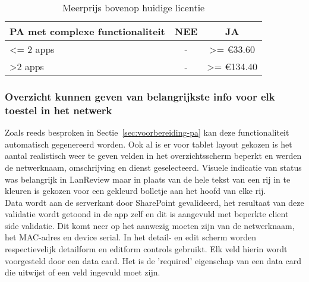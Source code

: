 \begin{table}[h!]
    \begin{tabular}{|l|c|c|}
        \hline
        \textbf{PA met complexe functionaliteit} & \textbf{NEE} & \textbf{JA}             \\ \hline
        \textless{}= 2 apps                      & -            & \textgreater{}= \euro 33.60  \\ \hline
        \textgreater 2 apps                      & -            & \textgreater{}= \euro 134.40 \\ \hline
    \end{tabular}
    \caption{Meerprijs bovenop huidige licentie}
\end{table}

\subsubsection{Overzicht kunnen geven van belangrijkste info voor elk toestel in het netwerk}

Zoals reeds besproken in Sectie~\ref{sec:voorbereiding-pa} kan deze functionaliteit automatisch gegenereerd worden. Ook al is er voor tablet layout gekozen is het aantal realistisch weer te geven velden in het overzichtsscherm beperkt en werden de netwerknaam, omschrijving en dienst geselecteerd. Visuele indicatie van status was belangrijk in LanReview maar in plaats van de hele tekst van een rij in te kleuren is gekozen voor een gekleurd bolletje aan het hoofd van elke rij.\\
Data wordt aan de serverkant door SharePoint gevalideerd, het resultaat van deze validatie wordt getoond in de app zelf en dit is aangevuld met beperkte client side validatie. Dit komt neer op het aanwezig moeten zijn van de netwerknaam, het MAC-adres en device serial. In het detail- en edit scherm worden respectievelijk detailform en editform controls gebruikt. Elk veld hierin wordt voorgesteld door een data card. Het is de 'required' eigenschap van een data card die uitwijst of een veld ingevuld moet zijn.

